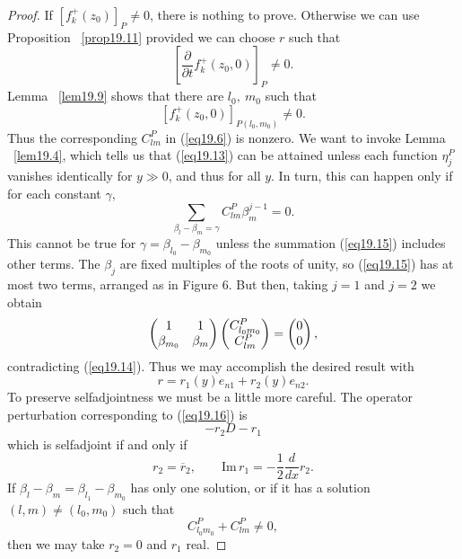 \documentclass{surv-l}
\theoremstyle{plain}
\theoremstyle{definition}
\numberwithin{equation}{chapter}
\begin{document}
\begin{proof} If $[f_{k}^{+}(z_{0})]_{P}\neq 0$, there is nothing to prove. Otherwise we can use Proposition ~\ref{prop19.11} provided we can choose $r$ such that
\setcounter{equation}{12}
\begin{equation}\label{eq19.13}
\left[\frac{\partial}{\partial t}f_{k}^{+}(z_{0},0)\right]_{P}\neq 0.
\end{equation}
Lemma ~\ref{lem19.9} shows that there are $l_{0},\ m_{0}$ such that
\begin{equation}\label{eq19.14}
[f_{k}^{+}(z_{0},0)]_{P(l_{0},m_{0})}\neq 0.
\end{equation}
Thus the corresponding $C_{lm}^{P}$ in (\ref{eq19.6}) is nonzero. We want to invoke Lemma ~\ref{lem19.4}, which tells us that (\ref{eq19.13}) can be attained unless each function $\eta_{j}^{P}$ vanishes identically for $y\gg 0$, and thus for all $y$. In turn, this can happen only if for each constant $\gamma,$
\begin{equation}\label{eq19.15}
\sum_{\beta_{l}-\beta_{m}=\gamma}C_{lm}^{P}\beta_{m}^{j-1}=0.
\end{equation}
This cannot be true for $\gamma = \beta_{l_{0}}-\beta_{m_{0}}$ unless the summation (\ref{eq19.15}) includes other terms. The $\beta_{j}$ are fixed multiples of the roots of unity, so (\ref{eq19.15}) has at most two terms, arranged as in Figure 6. But then, taking $j = 1$ and $j = 2$ we obtain
\begin{align*}
\left(\begin{array}{@{}cc@{}}
1 & 1\\
\beta_{m_{0}} & \beta_{m}
\end{array}\right)\left(\begin{array}{@{}c@{}}
C_{l_{0}m_{0}}^{P}\\
C_{lm}^{P}\end{array}\right)=\left(\begin{array}{@{}c@{}}
0\\
0
\end{array}\right),
\end{align*}
contradicting (\ref{eq19.14}). Thus we may accomplish the desired result with
\begin{equation}\label{eq19.16}
r=r_{1}(y)e_{n1}+r_{2}(y)e_{n2}.
\end{equation}
To preserve selfadjointness we must be a little more careful. The operator perturbation corresponding to (\ref{eq19.16}) is
\begin{equation*}
-r_{2}D-r_{1}
\end{equation*}
which is selfadjoint if and only if
\begin{equation}\label{eq19.17}
r_{2}=\overline{r}_{2},\qquad \mathrm{Im}\, r_{1} = -\frac{1}{2}\frac{d}{dx}r_{2}.
\end{equation}
If $\beta_{l}-\beta_{m} = \beta_{l_{1}}-\beta_{m_{0}}$ has only one solution, or if it has a solution $(l,m) \neq (l_{0},m_{0})$ such that
\begin{equation*}
C_{l_{0}m_{0}}^{P}+C_{lm}^{P}\neq 0,
\end{equation*}
then we may take $r_{2}=0$ and $r_{1}$ real.


\end{proof}
\end{document}
